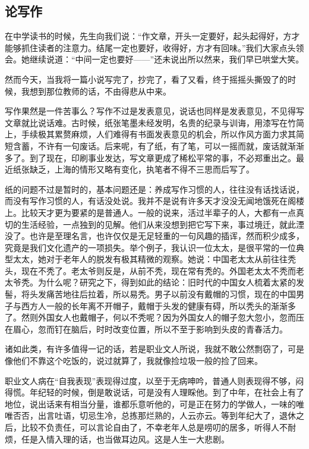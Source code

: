 \subsection{论写作}

\par 在中学读书的时候，先生向我们说：“作文章，开头一定要好，起头起得好，方才能够抓住读者的注意力。结尾一定也要好，收得好，方才有回味。”我们大家点头领会。她继续说道：“中间一定也要好——”还未说出所以然来，我们早已哄堂大笑。
\par 然而今天，当我将一篇小说写完了，抄完了，看了又看，终于摇摇头撕毁了的时候，我想到那位教师的话，不由得悲从中来。
\par 写作果然是一件苦事么？写作不过是发表意见，说话也同样是发表意见，不见得写文章就比说话难。古时候，纸张笔墨未经发明，名贵的纪录与训诲，用漆写在竹简上，手续极其累赘麻烦，人们难得有书面发表意见的机会，所以作风方面力求其简短含蓄，不许有一句废话。后来呢，有了纸，有了笔，可以一摇而就，废话就渐渐多了。到了现在，印刷事业发达，写文章更成了稀松平常的事，不必郑重出之。最近纸张缺乏，上海的情形又略有变化，执笔者不得不三思而后写了。
\par 纸的问题不过是暂时的，基本问题还是：养成写作习惯的人，往往没有话找话说，而没有写作习惯的人，有话没处说。我并不是说有许多天才没没无闻地饿死在阁楼上。比较天才更为要紧的是普通人。一般的说来，活过半辈子的人，大都有一点真切的生活经验，一点独到的见解。他们从来没想到把它写下来，事过境迁，就此湮没了。也许是至理名言，也许仅仅是无足轻重的一句风趣的插诨，然而积少成多，究竟是我们文化遗产的一项损失。举个例子，我认识一位太太，是很平常的一位典型太太，她对于老年人的脱发有极其精微的观察。她说：中国老太太从前往往秃头，现在不秃了。老太爷则反是，从前不秃，现在常有秃的。外国老太太不秃而老太爷秃。为什么呢？研究之下，得到如此的结论：旧时代的中国女人梳着太紧的发髻，将头发痛苦地往后拉着，所以易秃。男子以前没有戴帽的习惯，现在的中国男子与西方人一般的长年离不开帽子，戴帽于头发的健康有碍，所以秃头的渐渐多了。然则外国女人也戴帽子，何以不秃呢？因为外国女人的帽子忽大忽小，忽而压在眉心，忽而钉在脑后，时时改变位置，所以不至于影响到头皮的青春活力。
\par 诸如此类，有许多值得一记的话，若是职业文人所说，我就不敢公然剽窃了，可是像他们不靠这个吃饭的，说过就算了，我就像捡垃圾一般的捡了回来。
\par 职业文人病在“自我表现”表现得过度，以至于无病呻吟，普通人则表现得不够，闷得慌。年纪轻的时候，倒是敢说话，可是没有人理睬他。到了中年，在社会上有了地位，说出话来有相当分量，谁都乐意听他的，可是正在努力的学做人，一味的唯唯否否，出言吐语，切忌生冷，总拣那烂熟的，人云亦云。等到年纪大了，退休之后，比较不负责任，可以言论自由了，不幸老年人总是唠叨的居多，听得人不耐烦，任是入情入理的话，也当做耳边风。这是人生一大悲剧。
